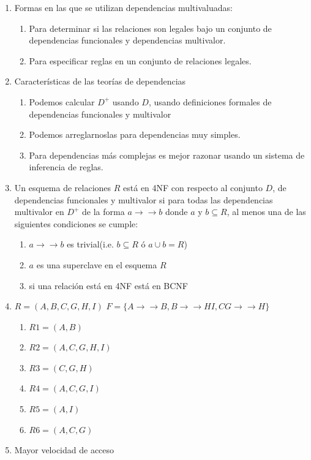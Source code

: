 \documentclass[twoside]{article}
\begin{document}
\begin{enumerate}
      \item Formas en las que se utilizan dependencias multivaluadas:
            \begin{enumerate}
                  \item Para determinar si las relaciones son legales bajo un conjunto de dependencias funcionales y dependencias multivalor.
                  \item Para especificar reglas en un conjunto de relaciones legales.
            \end{enumerate}
      \item Características de las teorías de dependencias
            \begin{enumerate}
                  \item Podemos calcular $D^+$ usando $D$, usando definiciones formales de dependencias funcionales y multivalor
                  \item Podemos arreglarnoslas para dependencias muy simples.
                  \item Para dependencias más complejas es mejor razonar usando un sistema de inferencia de reglas.
            \end{enumerate}
      \item Un esquema de relaciones $R$ está en 4NF con respecto al conjunto $D$, de dependencias funcionales y multivalor si para todas las dependencias
            multivalor en $D^+$ de la forma $a \rightarrow \rightarrow b$ donde $a$ y $b \subseteq R$, al menos una de las siguientes condiciones se cumple:
            \begin{enumerate}
                  \item $a \rightarrow \rightarrow b$ es trivial(i.e. $b \subseteq R$ ó $a \cup b = R$)
                  \item $a$ es una superclave en el esquema $R$
                  \item si una relación está en 4NF está en BCNF
            \end{enumerate}
      \item $R = (A, B, C, G ,H, I)$ $F = \{  A \rightarrow  \rightarrow B, B \rightarrow  \rightarrow HI, CG \rightarrow  \rightarrow H  \}$
            \begin{enumerate}
                  \item $R1 =  (A, B)$
                  \item $R2 = (A, C, G, H, I)$
                  \item $R3 = (C, G, H)$
                  \item $R4 = (A, C, G, I)$
                  \item $R5 = (A, I)$
                  \item $R6 = (A, C, G)$
            \end{enumerate}
      \item Mayor velocidad de acceso
\end{enumerate}
\end{document}
